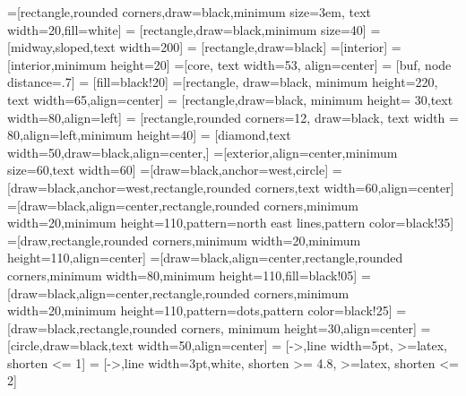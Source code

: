 \usepackage{siunitx}
\usepackage{tabulary}
\usepackage{listings}
\usepackage{pgfplots}
\usepackage{fancyvrb}
\pgfplotsset{compat=1.3}
\usepackage{tikz}
\usetikzlibrary{arrows,babel,backgrounds,circuits.logic.US,decorations.pathreplacing,fit,patterns,petri,positioning,shapes,shapes.gates.logic,trees}

\newcommand\blfootnote[1]{%
	\begingroup
	\renewcommand\thefootnote{}\footnote{#1}%
	\addtocounter{footnote}{-1}%
	\endgroup
}


=[rectangle,rounded corners,draw=black,minimum size=3em, text width=20,fill=white]
 = [rectangle,draw=black,minimum size=40]
 = [midway,sloped,text width=200]
 = [rectangle,draw=black]
=[interior]
 = [interior,minimum height=20]
=[core, text width=53, align=center]
 = [buf, node distance=.7]
 = [fill=black!20]
=[rectangle, draw=black, minimum height=220, text width=65,align=center]
 = [rectangle,draw=black, minimum height= 30,text width=80,align=left]
 = [rectangle,rounded corners=12, draw=black, text width = 80,align=left,minimum height=40]
 = [diamond,text width=50,draw=black,align=center,]
=[exterior,align=center,minimum size=60,text width=60]
=[draw=black,anchor=west,circle]
=[draw=black,anchor=west,rectangle,rounded corners,text width=60,align=center]
=[draw=black,align=center,rectangle,rounded corners,minimum width=20,minimum height=110,pattern=north east lines,pattern color=black!35]
=[draw,rectangle,rounded corners,minimum width=20,minimum height=110,align=center]
=[draw=black,align=center,rectangle,rounded corners,minimum width=80,minimum height=110,fill=black!05]
=[draw=black,align=center,rectangle,rounded corners,minimum width=20,minimum height=110,pattern=dots,pattern color=black!25]
=[draw=black,rectangle,rounded corners, minimum height=30,align=center]
=[circle,draw=black,text width=50,align=center]
 = [->,line width=5pt, >=latex, shorten <= 1]
 = [->,line width=3pt,white, shorten >= 4.8, >=latex, shorten <= 2]

